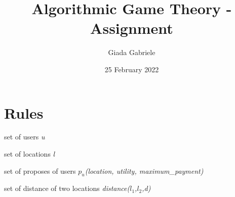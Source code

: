 \documentclass{article}
\title{Algorithmic Game Theory - Assignment}
\author{Giada Gabriele}
\date{25 February 2022}
\begin{document}
\maketitle
\section{Rules}
\begin{itemize}
\Large{
\item set of users \textit{u}
\item set of locations \textit{l}
\item set of proposes of users \textit{$p_u$(location, utility, maximum\_payment)}
\item set of distance of two locations \textit{distance($l_1$,$l_2$,d)}
}
\end{itemize}
\end{document}
